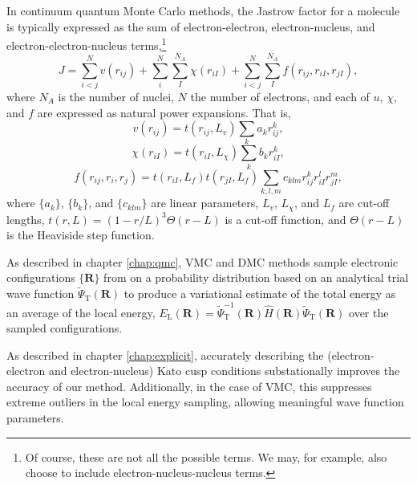 In continuum quantum Monte Carlo methods, the Jastrow factor for a molecule is typically expressed as the sum of electron-electron, electron-nucleus, and electron-electron-nucleus terms,\footnote{Of course, these are not all the possible terms. We may, for example, also choose to include electron-nucleus-nucleus terms.}
\begin{equation}
    \label{eq:jastrow}
    J = \sum_{i<j}^Nv(r_{ij}) + \sum_i^N\sum_I^{N_A}\chi(r_{iI}) + \sum_{i<j}^N\sum_I^{N_A}f(r_{ij}, r_{iI}, r_{jI}),
\end{equation}
where $N_A$ is the number of nuclei, $N$ the number of electrons, and each of $u$, $\chi$, and $f$ are expressed as natural power expansions. That is,
\begin{equation}
    \label{eq:dtn-jastrow-ee}
    v(r_{ij})    = t(r_{ij},L_v)
                    \sum_{k} a_k r_{ij}^k ,
\end{equation}
\begin{equation}
    \label{eq:dtn-jastrow-en}
    \chi(r_{iI}) = t(r_{iI},L_\chi)
    \sum_{k} b_k r_{iI}^k ,
\end{equation}
\begin{equation}
    \label{eq:dtn-jastrow-een}
    f(r_{ij}, r_{i}, r_{j}) = t(r_{iI},L_f) t(r_{jI},L_f)
    \sum_{k,l,m} c_{klm}
    r_{ij}^k r_{iI}^l r_{jI}^m ,
\end{equation}
where $\{a_k\}$, $\{b_k\}$, and $\{c_{klm}\}$ are linear parameters,
$L_v$, $L_\chi$, and $L_f$ are cut-off lengths, $t(r,L) = (1-r/L)^3
\Theta(r-L)$ is a cut-off function, and $\Theta(r-L)$ is the Heaviside
step function.

As described in chapter \ref{chap:qmc}, \gls{VMC} and \gls{DMC} methods sample electronic configurations $\{\mathbf R\}$ from on a probability distribution based on an analytical trial wave function $\tilde\Psi_{\mathrm T}(\mathbf R)$ to produce a variational estimate of the total energy as an average of the local energy, $E_{\mathrm L}({\mathbf R}) = \tilde\Psi_{\mathrm T}^{-1}({\mathbf R}) \hat H({\mathbf R}) \tilde\Psi_{\mathrm T}({\mathbf R})$ over the sampled configurations.

As described in chapter \ref{chap:explicit}, accurately describing the (electron-electron and electron-nucleus) Kato cusp conditions\supercite{katoEigenfunctionsManyparticleSystems1957a} substationally improves the accuracy of our method. Additionally, in the case of \gls{VMC}, this suppresses extreme outliers in the local energy sampling, allowing meaningful wave function parameters.



